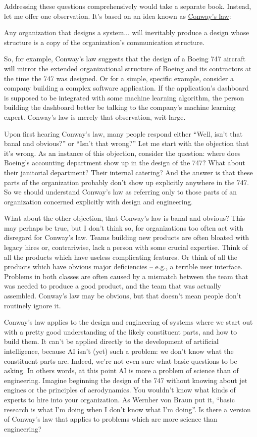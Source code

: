 \documentclass[a4paper,twoside,10pt]{book}
\begin{document}
Addressing these questions comprehensively would take a separate book. Instead, let me offer one observation. It's based on an idea known as \href{http://en.wikipedia.org/wiki/Conway\%27s_law}{Conway's law}:
\begin{adjustwidth}{1.5cm}{0.5cm}
Any organization that designs a system... will inevitably produce a design whose structure is a copy of the organization's communication structure.
\end{adjustwidth}
So, for example, Conway's law suggests that the design of a Boeing 747 aircraft will mirror the extended organizational structure of Boeing and its contractors at the time the 747 was designed. Or for a simple, specific example, consider a company building a complex software application. If the application's dashboard is supposed to be integrated with some machine learning algorithm, the person building the dashboard better be talking to the company's machine learning expert. Conway's law is merely that observation, writ large.

Upon first hearing Conway's law, many people respond either ``Well, isn't that banal and obvious?'' or ``Isn't that wrong?'' Let me start with the objection that it's wrong. As an instance of this objection, consider the question: where does Boeing's accounting department show up in the design of the 747? What about their janitorial department? Their internal catering? And the answer is that these parts of the organization probably don't show up explicitly anywhere in the 747. So we should understand Conway's law as referring only to those parts of an organization concerned explicitly with design and engineering.

What about the other objection, that Conway's law is banal and obvious? This may perhaps be true, but I don't think so, for organizations too often act with disregard for Conway's law. Teams building new products are often bloated with legacy hires or, contrariwise, lack a person with some crucial expertise. Think of all the products which have useless complicating features. Or think of all the products which have obvious major deficiencies -- e.g., a terrible user interface. Problems in both classes are often caused by a mismatch between the team that was needed to produce a good product, and the team that was actually assembled. Conway's law may be obvious, but that doesn't mean people don't routinely ignore it.

Conway's law applies to the design and engineering of systems where we start out with a pretty good understanding of the likely constituent parts, and how to build them. It can't be applied directly to the development of artificial intelligence, because AI isn't (yet) such a problem: we don't know what the constituent parts are. Indeed, we're not even sure what basic questions to be asking. In others words, at this point AI is more a problem of science than of engineering. Imagine beginning the design of the 747 without knowing about jet engines or the principles of aerodynamics. You wouldn't know what kinds of experts to hire into your organization. As Wernher von Braun put it, ``basic research is what I'm doing when I don't know what I'm doing''. Is there a version of Conway's law that applies to problems which are more science than engineering?
\end{document}

